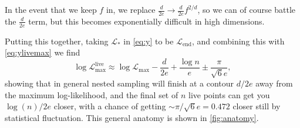 \documentclass[usenatbib]{mnras}
\begin{document}
In the event that we keep $f$ in, we replace $\frac{d}{2e}\to \frac{d}{2e}f^{2/d}$, so we can of course battle the $\frac{d}{2e}$ term, but this becomes exponentially difficult in high dimensions.
\par
Putting this together, taking $\mathcal{L}_*$ in \cref{eq:y} to be $\mathcal{L}_\mathrm{end}$, and combining this with \cref{eq:ylivemax} we find
\begin{equation}
    \boxed{
        \log{\mathcal{L}}_\mathrm{max}^\mathrm{live} \approx \log\mathcal{L}_\mathrm{max} - \frac{d}{2e} + \frac{\log n}{e} \pm \frac{\pi}{\sqrt{6}e}
    },
\end{equation}
showing that in general nested sampling will finish at a contour $d/2e$ away from the maximum log-likelihood, and the final set of $n$ live points can get you $\log (n)/2e$ closer, with a chance of getting $\sim\pi/\sqrt{6}e=0.472$ closer still by statistical fluctuation. This general anatomy is shown in \cref{fig:anatomy}.

\label{lastpage}
\end{document}
